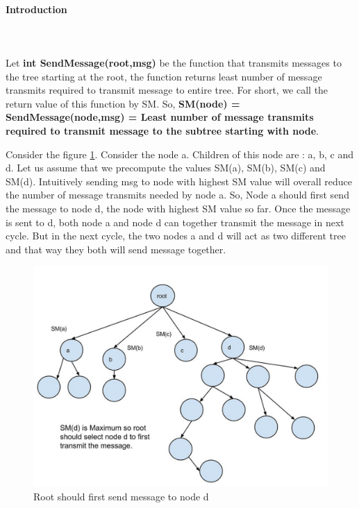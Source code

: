 \paragraph{Introduction} \\
\\
Let \textbf{int  SendMessage(root,msg)} be the function that transmits messages to the tree starting at the root, the function returns least number of message transmits required to transmit message to entire tree. 
For short, we call the return value of this function by SM. 
So, \textbf{SM(node) = SendMessage(node,msg) = Least number of message transmits required to transmit message to the subtree starting with node}. 

Consider the figure \ref{fig:4a}. Consider the node a. Children of this node are : a, b, c and d. Let us assume that we precompute the values SM(a), SM(b), SM(c) and SM(d). Intuitively sending msg to node with highest SM value will overall reduce the number of message transmits needed by node a. So, Node a should first send the message to node d, the node with highest SM value so far. Once the message is sent to d,  both node a and node d can together transmit the message in next cycle. But in the next cycle, the two nodes a and d will act as two different tree and that way they both will send message together.

\begin{figure}[4a]
    \centering
    \includegraphics[scale=0.10]{4a}
    \caption{Root should first send message to node d}
    \label{fig:4a}
\end{figure}


